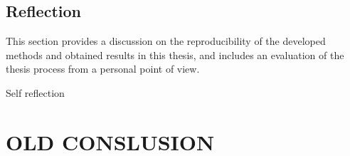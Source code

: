 \section{Reflection}
\label{sec:reflection}

This section provides a discussion on the reproducibility of the developed methods and obtained results in this thesis, and includes an evaluation of the thesis process from a personal point of view.

Self reflection 



\chapter{OLD CONSLUSION}














